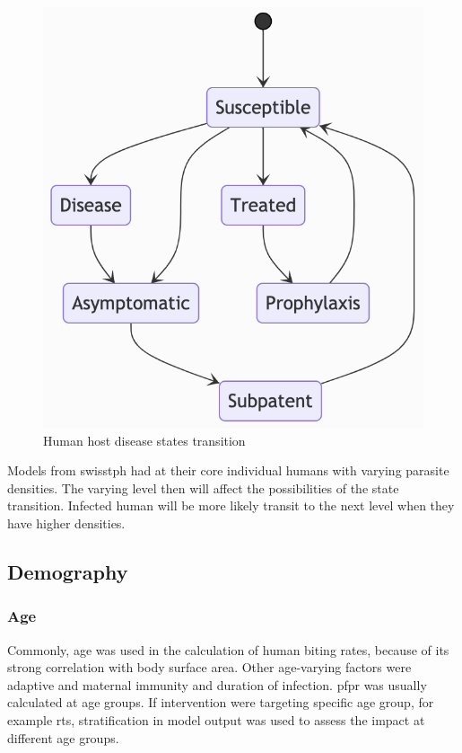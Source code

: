 \documentclass[a4paper, 12pt, twoside]{article}
\begin{document}
\begin{figure}[t]
	\centering
	\includegraphics[keepaspectratio=true, scale=0.8]{images/disease-state-transition-diagram.png}
	\caption{Human host disease states transition}
\end{figure}

Models from \gls{swisstph} had at their core individual humans with varying parasite densities. The varying level then will affect the possibilities of the state transition. Infected human will be more likely transit to the next level when they have higher densities.

\subsection{Demography}

\subsubsection{Age}
Commonly, age was used in the calculation of human biting rates, because of its strong correlation with body surface area.
Other age-varying factors were adaptive and maternal immunity and duration of infection.
\gls{pfpr} was usually calculated at age groups.
If intervention were targeting specific age group, for example \gls{rts}, stratification in model output was used to assess the impact at different age groups.
\end{document}
